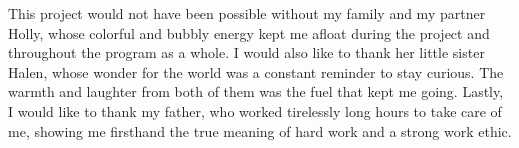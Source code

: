 \documentclass[12pt,leqno]{article}\usepackage[pdftex]{graphicx}\usepackage[dvipsnames]{xcolor}
\theoremstyle{remark}
\begin{document}
This project would not have been possible without my family and my partner Holly, whose colorful and bubbly energy kept me afloat during the project and throughout the program as a whole. I would also like to thank her little sister Halen, whose wonder for the world was a constant reminder to stay curious. The warmth and laughter from both of them was the fuel that kept me going. Lastly, I would like to thank my father, who worked tirelessly long hours to take care of me, showing me firsthand the true meaning of hard work and a strong work ethic.


\singlespacing
\thispagestyle{empty}
\newpage


\begin{center}
\tableofcontents
\end{center}
\thispagestyle{empty}
\newpage






\begin{center}
\listoftables
\end{center}
\thispagestyle{empty}
\newpage


\begin{center}
\listoffigures
\end{center}
\thispagestyle{empty}
\newpage
\end{document}
